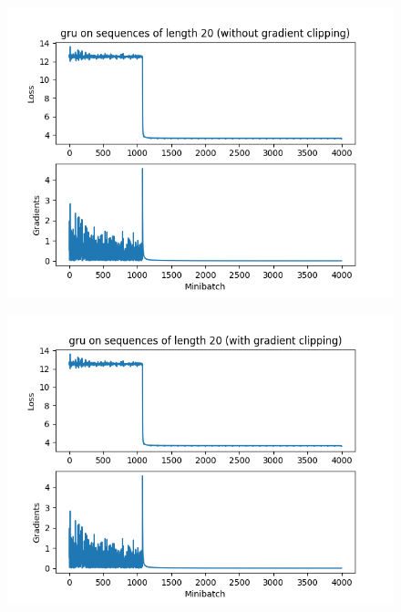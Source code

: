\documentclass[fleqn]{MJD}
\newcommand{\0}{\emptyset}
\begin{document}
\begin{figure}[!htbp]\centering
	\includegraphics[scale=0.9]{q3-noclip-gru.png}
	\label{figure:GRU no clip}
\end{figure}
\begin{figure}[!htbp]\centering
	\includegraphics[scale=0.9]{q3-clip-gru.png}
	\label{figure:GRU with clip}
\end{figure}
\newpage
\end{document}
